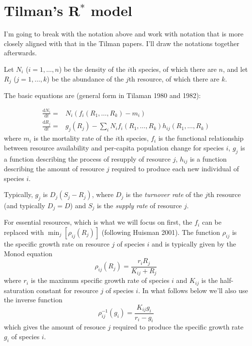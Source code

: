 \documentclass[12pt,a4paper]{article}
\newcommand{\ud}{\mathrm{d}}
\begin{document}
\section{Tilman's R$^*$ model}

I'm going to break with the notation above and work with notation that is more closely aligned with that in the Tilman papers.  I'll draw the notations together afterwards.

Let $N_i$ ($i = 1, \ldots, n$) be the density of the $i$th species, of which there are $n$, and let $R_j$ ($j = 1, \ldots, k$) be the abundance of the $j$th resource, of which there are $k$.

The basic equations are (general form in Tilaman 1980 and 1982):

\begin{equation}
\begin{split}
\frac{\ud N_i}{\ud t} =& N_i (f_i(R_1, \ldots, R_k) - m_i)\\
\frac{\ud R_j}{\ud t} =& g_j(R_j) - \sum_i N_i f_i(R_1, \ldots, R_k) h_{ij}(R_1, \ldots, R_k)
\end{split}
\end{equation}
%
where $m_i$ is the mortality rate of the $i$th species, $f_i$ is the
functional relationship between resource availability and per-capita
population change for species $i$, $g_j$ is a function describing the
process of resupply of resource $j$, $h_{ij}$ is a function describing
the amount of resource $j$ required to produce each new individual of
species $i$.

Typically, $g_j$ is $D_j (S_j - R_j)$, where $D_j$ is the
\emph{turnover rate} of the $j$th resource (and typically $D_j = D$)
and $S_j$ is the \emph{supply rate} of resource $j$.

For essential resources, which is what we will focus on first, the
$f_i$ can be replaced with $\min_j[\rho_{ij}(R_j)]$ (following Huisman
2001).  The function $\rho_{ij}$ is the specific growth rate on
resource $j$ of species $i$ and is typically given by the Monod
equation
%
\begin{equation*}
  \rho_{ij}(R_j) = \frac{r_i R_j}{K_{ij} + R_j}
\end{equation*}
%
where $r_i$ is the maximum specific growth rate of species $i$ and
$K_{ij}$ is the half-saturation constant for resource $j$ of species
$i$.  In what follows below we'll also use the inverse function
\begin{equation*}
  \rho_{ij}^{-1}(g_i) = \frac{K_{ij}g_i}{r_i - g_i}
\end{equation*}
which gives the amount of resouce $j$ required to produce the specific
growth rate $g_i$ of species $i$.
\end{document}
